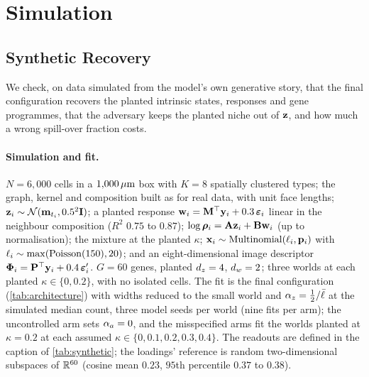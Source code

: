 \section{Simulation}
\label{app:simulation}
\subsection{Synthetic Recovery}
\label{app:synthetic}

We check, on data simulated from the model's own generative story, that the final configuration recovers the planted intrinsic states, responses and gene programmes, that the adversary keeps the planted niche out of $\mathbf{z}$, and how much a wrong spill-over fraction costs.

\paragraph{Simulation and fit.} $N = 6{,}000$ cells in a $1{,}000\,\mu\text{m}$ box with $K = 8$ spatially clustered types; the graph, kernel and composition built as for real data, with unit face lengths; $\mathbf{z}_i \sim \mathcal{N}(\mathbf{m}_{t_i}, 0.5^2\mathbf{I})$; a planted response $\mathbf{w}_i = \mathbf{M}^\top\mathbf{y}_i + 0.3\,\boldsymbol\varepsilon_i$ linear in the neighbour composition ($R^2$ $0.75$ to $0.87$); $\log\boldsymbol{\rho}_i = \mathbf{A}\mathbf{z}_i + \mathbf{B}\mathbf{w}_i$ (up to normalisation); the mixture at the planted $\kappa$; $\mathbf{x}_i \sim \operatorname{Multinomial}(\ell_i, \mathbf{p}_i)$ with $\ell_i \sim \max(\operatorname{Poisson}(150), 20)$; and an eight-dimensional image descriptor $\boldsymbol{\Phi}_i = \mathbf{P}^\top\mathbf{y}_i + 0.4\,\boldsymbol\varepsilon'_i$. $G = 60$ genes, planted $d_z = 4$, $d_w = 2$; three worlds at each planted $\kappa \in \{0, 0.2\}$, with no isolated cells. The fit is the final configuration (\cref{tab:architecture}) with widths reduced to the small world and $\alpha_z = \tfrac12/\bar{\ell}$ at the simulated median count, three model seeds per world (nine fits per arm); the uncontrolled arm sets $\alpha_a = 0$, and the misspecified arms fit the worlds planted at $\kappa = 0.2$ at each assumed $\kappa \in \{0, 0.1, 0.2, 0.3, 0.4\}$. The readouts are defined in the caption of \cref{tab:synthetic}; the loadings' reference is random two-dimensional subspaces of $\mathbb{R}^{60}$ (cosine mean $0.23$, $95$th percentile $0.37$ to $0.38$).

